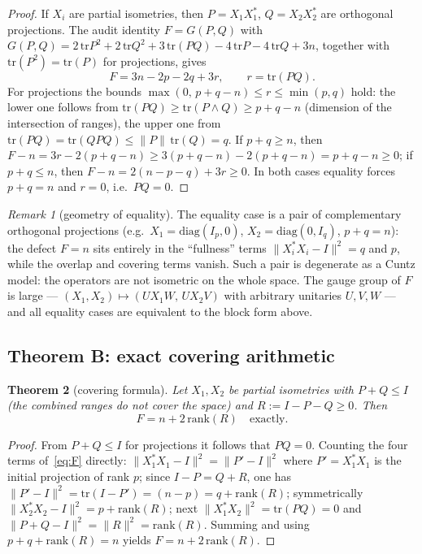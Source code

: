 \documentclass[11pt,a4paper]{article}
\newtheorem{theorem}{Theorem}[section]
\theoremstyle{definition}
\theoremstyle{remark}
\newtheorem{remark}[theorem]{Remark}
\begin{document}
\begin{proof}
If $X_i$ are partial isometries, then $P = X_1X_1^*$, $Q = X_2X_2^*$ are
orthogonal projections. The audit identity $F = G(P,Q)$ with
$G(P,Q) = 2\,\mathrm{tr}P^2 + 2\,\mathrm{tr}Q^2 + 3\,\mathrm{tr}(PQ)
- 4\,\mathrm{tr}P - 4\,\mathrm{tr}Q + 3n$, together with
$\mathrm{tr}(P^2) = \mathrm{tr}(P)$ for projections, gives
\begin{equation}\label{eq:Fproj}
F = 3n - 2p - 2q + 3r, \qquad r = \mathrm{tr}(PQ).
\end{equation}
For projections the bounds $\max(0,\, p + q - n) \le r \le \min(p, q)$
hold: the lower one follows from $\mathrm{tr}(PQ) \ge \mathrm{tr}(P \wedge Q)
\ge p + q - n$ (dimension of the intersection of ranges), the upper one from
$\mathrm{tr}(PQ) = \mathrm{tr}(QPQ) \le \|P\|\,\mathrm{tr}(Q) = q$. If
$p + q \ge n$, then $F - n = 3r - 2(p+q-n) \ge 3(p+q-n) - 2(p+q-n) =
p+q-n \ge 0$; if $p + q \le n$, then $F - n = 2(n - p - q) + 3r \ge 0$. In
both cases equality forces $p + q = n$ and $r = 0$, i.e.\ $PQ = 0$.
\end{proof}

\begin{remark}[geometry of equality]\label{rem:equality}
The equality case is a pair of complementary orthogonal projections (e.g.\
$X_1 = \mathrm{diag}(I_p, 0)$, $X_2 = \mathrm{diag}(0, I_q)$, $p + q = n$):
the defect $F = n$ sits entirely in the ``fullness'' terms
$\|X_i^*X_i - I\|^2 = q$ and $p$, while the overlap and covering terms
vanish. Such a pair is degenerate as a Cuntz model: the operators are not
isometric on the whole space. The gauge group of $F$ is large ---
$(X_1, X_2) \mapsto (UX_1W,\, UX_2V)$ with arbitrary unitaries $U, V, W$
--- and all equality cases are equivalent to the block form above.
\end{remark}

\subsection{Theorem B: exact covering arithmetic}

\begin{theorem}[covering formula]\label{thm:B}
Let $X_1, X_2$ be partial isometries with $P + Q \le I$ (the combined ranges
do not cover the space) and $R := I - P - Q \ge 0$. Then
\begin{equation}\label{eq:thmB}
F = n + 2\,\mathrm{rank}(R) \quad \text{exactly.}
\end{equation}
\end{theorem}
\begin{proof}
From $P + Q \le I$ for projections it follows that $PQ = 0$. Counting the
four terms of~\eqref{eq:F} directly: $\|X_1^*X_1 - I\|^2 = \|P' - I\|^2$
where $P' = X_1^*X_1$ is the initial projection of rank $p$; since
$I - P = Q + R$, one has $\|P' - I\|^2 = \mathrm{tr}(I - P') = (n - p) =
q + \mathrm{rank}(R)$; symmetrically $\|X_2^*X_2 - I\|^2 = p +
\mathrm{rank}(R)$; next $\|X_1^*X_2\|^2 = \mathrm{tr}(PQ) = 0$ and
$\|P + Q - I\|^2 = \|R\|^2 = \mathrm{rank}(R)$. Summing and using
$p + q + \mathrm{rank}(R) = n$ yields $F = n + 2\,\mathrm{rank}(R)$.
\end{proof}
\end{document}
